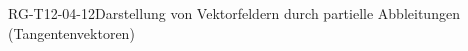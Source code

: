
\begin{REM}{RG-T12-04-12}{Darstellung von Vektorfeldern durch partielle Abbleitungen (Tangentenvektoren)}
\end{REM}
